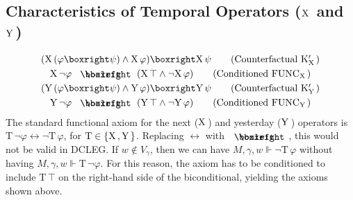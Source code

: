 \documentclass{article}
\begin{document}
\subsection{Characteristics of Temporal Operators ($\text{X}\,$ and $\text{Y}\,$)}
\begin{gather}
    (\X(\varphi\boxright\psi)\land\X\varphi)\boxright\X\psi\tag{Counterfactual K$'_{\X}$}\\
    \X\lnot\varphi\boxiff(\X\top\land\lnot\X\varphi)\tag{Conditioned FUNC$_{\X}$}\\(\Y(\varphi\boxright\psi)\land\Y\varphi)\boxright\Y\psi\tag{Counterfactual K$'_{\Y}$}\\
    \Y\lnot\varphi\boxiff(\Y\top\land\lnot\Y\varphi)\tag{Conditioned FUNC$_{\Y}$}
\end{gather}
The standard functional axiom for the next ($\text{X}\,$) and yesterday ($\text{Y}\,$) operators is $\text{T}\,\lnot\varphi\longleftrightarrow\lnot\text{T}\,\varphi$, for $\text{T}\in\{\text{X}\,,\text{Y}\,\}$. Replacing $\longleftrightarrow$ with $\boxiff$, this would not be valid in DCLEG. If $w\notin V_{\gamma}$, then we can have $M,\gamma,w\Vdash\lnot\text{T}\,\varphi$ without having $M,\gamma,w\Vdash\text{T}\,\lnot\varphi$. For this reason, the axiom has to be conditioned to include $\text{T}\,\top$ on the right-hand side of the biconditional, yielding the axioms shown above.
\end{document}

